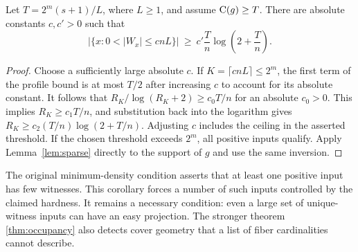 \begin{corollary}
\label{cor:sparse-population}
Let $T=2^m(s+1)/L$, where $L\ge1$, and assume $\mathrm{C}(g)\ge T$.
There are absolute constants $c,c'>0$ such that
\[
 \bigl|\{x:0<|W_x|\le c nL\}\bigr|
 \ \ge\ c'\frac{T}{n}\log\!\left(2+\frac{T}{n}\right).
\]
\end{corollary}
\begin{proof}
Choose a sufficiently large absolute $c$. If
$K=\lceil c nL\rceil\le2^m$, the first term of the profile bound
is at most $T/2$ after increasing $c$ to account for its absolute
constant. It follows that $R_K/\log(R_K+2)\ge c_0T/n$ for an
absolute $c_0>0$. This implies $R_K\ge c_1T/n$, and substitution
back into the logarithm gives
$R_K\ge c_2(T/n)\log(2+T/n)$. Adjusting $c$ includes the ceiling
in the asserted threshold. If the chosen threshold exceeds $2^m$,
all positive inputs qualify. Apply Lemma~\ref{lem:sparse} directly
to the support of $g$ and use the same inversion.
\end{proof}

The original minimum-density condition asserts that at least one
positive input has few witnesses. This corollary forces a number of
such inputs controlled by the claimed hardness. It remains a necessary
condition: even a large set of unique-witness inputs can have an easy
projection. The stronger theorem \ref{thm:occupancy} also detects
cover geometry that a list of fiber cardinalities cannot describe.
